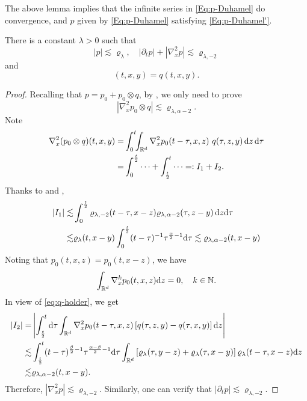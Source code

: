 The above lemma implies that the infinite series in \eqref{Eq:p-Duhamel} do convergence, and \(p\) given by \eqref{Eq:p-Duhamel} satisfying \eqref{Eq:p-Duhamel'}. 

\begin{lemma}\label{Lem:D2p}
    There is a constant \(\lambda>0\) such that 
    \begin{equation}
        |p|\lesssim \varrho_{\lambda}, \quad |\partial_t p|+ |\nabla^2_x p| \lesssim \varrho_{\lambda, -2}
    \end{equation}
    and 
    \begin{equation}
        [L-L_{a(y)})p](t,x,y)=q(t,x,y). 
    \end{equation}
\end{lemma}
\begin{proof}
    Recalling that \(p=p_0+p_0\otimes q\), by , we only need to prove 
    \begin{equation}\label{eq:p0q}
        |\nabla_x^2 p_0\otimes q | \lesssim \varrho_{\lambda, \alpha-2}. 
    \end{equation}
    Note 
    \begin{equation*}
    \begin{aligned}
        \nabla_x^2 (p_0\otimes q)(t,x,y)
        =& \int_0^t\!\!\int_{{\mathbb R}^d}\nabla_x^2 p_0(t-\tau,x,z) ~q(\tau,z,y) \, \text{\rm{d}} z \, \text{\rm{d}} \tau\\
        =&\int_0^{\frac{t}{2}} \cdots+ \int_{\frac{t}{2}}^t \cdots=:I_1+I_2. 
    \end{aligned}
    \end{equation*}
    Thanks to  and , 
    \begin{align*}
        |I_1|\lesssim&  \int_0^{\frac{t}{2}}\varrho_{\lambda, -2}(t-\tau,x-z) \varrho_{\lambda, \alpha-2}(\tau,z-y) \, \text{\rm{d}} z \text{\rm{d}} \tau\\
        \lesssim&  \varrho_\lambda(t,x-y) \int_0^{\frac{t}{2}} (t-\tau)^{-1} \tau^{\frac{\alpha}{2}-1} \text{\rm{d}} \tau \lesssim  \varrho_{\lambda, \alpha-2} (t,x-y) 
    \end{align*}
    Noting that \(p_0(t,x,z)=p_0(t,x-z)\), we have  
    \[
    \int_{{\mathbb R}^d}\nabla^k_x p_0(t,x,z) \text{\rm{d}} z=0, \quad k\in {\mathbb N}. 
    \]
    In view of \eqref{eq:q-holder}, we get 
    \begin{align*}
        |I_2|=& \left| \int_{\frac{t}{2}}^t \text{\rm{d}} \tau \int_{{\mathbb R}^d}\nabla_x^2p_0(t-\tau, x,z) \left[ q(\tau, z, y) - q(\tau, x, y) \right] \text{\rm{d}} z \right| \\
        \lesssim & \int_{\frac{t}{2}}^t (t-\tau)^{\frac{\beta}{2}-1} \tau^{\frac{\alpha-\beta}{2}-1} \text{\rm{d}} \tau \int_{{\mathbb R}^d}\left[ \varrho_{\lambda}(\tau,y-z)+ \varrho_{\lambda}(\tau,x-y)\right] \varrho_{\lambda} (t-\tau,x-z) \text{\rm{d}} z \\
        \lesssim & \varrho_{\lambda, \alpha-2} (t,x-y). 
    \end{align*}
    Therefore, \(|\nabla_x^2 p|\lesssim \varrho_{\lambda, -2}\). Similarly, one can verify that \(|\partial_tp|\lesssim \varrho_{\lambda, -2}\). 
\end{proof}

